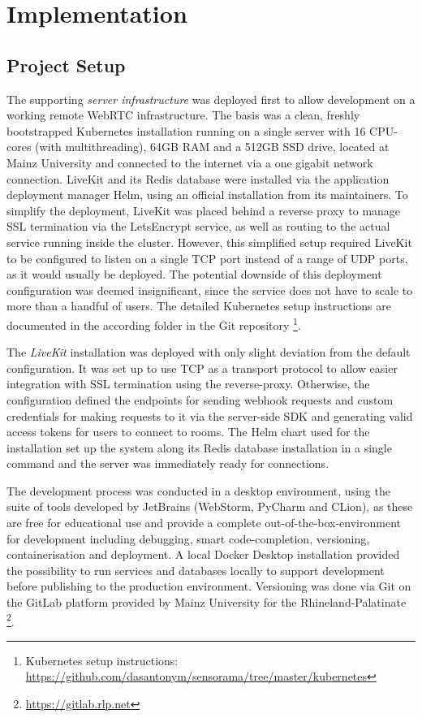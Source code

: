 \chapter{Implementation}

\section{Project Setup}

The supporting \emph{server infrastructure} was deployed first to allow development on a working remote WebRTC infrastructure. The basis was a clean, freshly bootstrapped Kubernetes installation running on a single server with 16 CPU-cores (with multithreading), 64GB RAM and a 512GB SSD drive, located at Mainz University and connected to the internet via a one gigabit network connection.
LiveKit and its Redis database were installed via the application deployment manager Helm, using an official installation from its maintainers.
To simplify the deployment, LiveKit was placed behind a reverse proxy to manage SSL termination via the LetsEncrypt service, as well as routing to the actual service running inside the cluster.
However, this simplified setup required LiveKit to be configured to listen on a single TCP port instead of a range of UDP ports, as it would usually be deployed.
The potential downside of this deployment configuration was deemed insignificant, since the service does not have to scale to more than a handful of users.
The detailed Kubernetes setup instructions are documented in the according folder in the Git repository \footnote{Kubernetes setup instructions: \href{https://github.com/dasantonym/sensorama/tree/master/kubernetes}{https://github.com/dasantonym/sensorama/tree/master/kubernetes}}.

The \emph{LiveKit} installation was deployed with only slight deviation from the default configuration.
It was set up to use TCP as a transport protocol to allow easier integration with SSL termination using the reverse-proxy.
Otherwise, the configuration defined the endpoints for sending webhook requests and custom credentials for making requests to it via the server-side \ac{SDK} and generating valid access tokens for users to connect to rooms.
The Helm chart used for the installation set up the system along its Redis database installation in a single command and the server was immediately ready for connections.

The development process was conducted in a desktop environment, using the suite of tools developed by JetBrains (WebStorm, PyCharm and CLion), as these are free for educational use and provide a complete out-of-the-box-environment for development including debugging, smart code-completion, versioning, containerisation and deployment.
A local Docker Desktop installation provided the possibility to run services and databases locally to support development before publishing to the production environment.
Versioning was done via Git on the GitLab platform provided by Mainz University for the Rhineland-Palatinate \footnote{\url{https://gitlab.rlp.net}}.

